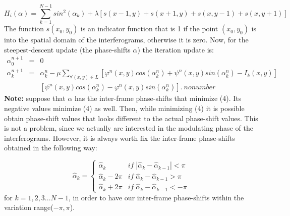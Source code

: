 \begin{equation}
H_{i}(\alpha)=\sum_{k=1}^{N-1}sin^{2}(\alpha_{k})+\lambda[s(x-1,y)+s(x+1,y)+s(x,
y-1)+s(x,y+1)]
\end{equation}
The function $s(x_{0},y_{0})$ is an indicator function that is 1
if the point $(x_{0},y_{0})$ is into the spatial domain of the interferograms,
otherwise it is zero. Now, for the steepest-descent update (the phase-shifts
$\alpha$) the iteration update is:
\begin{eqnarray}
\alpha_{0}^{n+1} & = & 0\\
\alpha_{k}^{n+1} & = & \alpha_{k}^{n}-\mu\sum_{\forall(x,y)\in L}[\varphi^{n}(x,
y)cos(\alpha_{k}^{n})+\psi^{n}(x,y)sin(\alpha_{k}^{n})-I_{k}(x,y)]\\
 &  & [\psi^{n}(x,y)cos(\alpha_{k}^{n})-\varphi^{n}(x,y)sin(\alpha_{k}^{n})].\
nonumber 
\end{eqnarray}
\textbf{Note:} suppose that $\alpha$ has the inter-frame phase-shifts
that minimize (4). Its negative values minimize (4) as well. Then,
while minimizing (4) it is possible obtain phase-shift values that
looks different to the actual phase-shift values. This is not a problem,
since we actually are interested in the modulating phase of the interferograms.
However, it is always worth fix the inter-frame phase-shifts obtained
in the following way:

\begin{equation}
\widehat{\alpha}_{k}=\begin{cases}
\widehat{\alpha}_{k} & if\;|\widehat{\alpha}_{k}-\widehat{\alpha}_{k-1}|<\pi\\
\widehat{\alpha}_{k}-2\pi &
if\;\widehat{\alpha}_{k}-\widehat{\alpha}_{k-1}>\pi\\
\widehat{\alpha}_{k}+2\pi & if\;\widehat{\alpha}_{k}-\widehat{\alpha}_{k-1}<-\pi
\end{cases}
\end{equation}
for $k=1,2,3...N-1$, in order to have our inter-frame
phase-shifts within the variation range($-\pi,\pi$).


%
%






